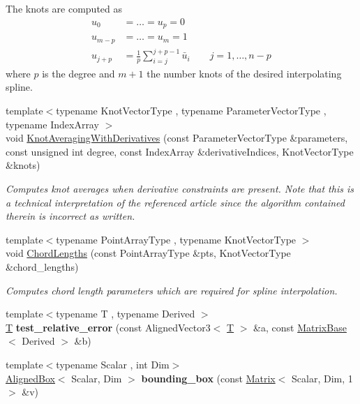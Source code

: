 \begin{DoxyCompactItemize}
\begin{DoxyCompactList}
The knots are computed as \begin{align*} u_0 & = \hdots = u_p = 0 \\ u_{m-p} & = \hdots = u_{m} = 1 \\ u_{j+p} & = \frac{1}{p}\sum_{i=j}^{j+p-1}\bar{u}_i \quad\quad j=1,\hdots,n-p \end{align*} where $p$ is the degree and $m+1$ the number knots of the desired interpolating spline. \end{DoxyCompactList}\item 
{\footnotesize template$<$typename Knot\+Vector\+Type , typename Parameter\+Vector\+Type , typename Index\+Array $>$ }\\void \hyperlink{group___splines___module_gae10a6f9b6ab7fb400a2526b6382c533b}{Knot\+Averaging\+With\+Derivatives} (const Parameter\+Vector\+Type \&parameters, const unsigned int degree, const Index\+Array \&derivative\+Indices, Knot\+Vector\+Type \&knots)
\begin{DoxyCompactList}\small\item\em Computes knot averages when derivative constraints are present. Note that this is a technical interpretation of the referenced article since the algorithm contained therein is incorrect as written. \end{DoxyCompactList}\item 
{\footnotesize template$<$typename Point\+Array\+Type , typename Knot\+Vector\+Type $>$ }\\void \hyperlink{group___splines___module_ga1b4cbde5d98411405871accf877552d2}{Chord\+Lengths} (const Point\+Array\+Type \&pts, Knot\+Vector\+Type \&chord\+\_\+lengths)
\begin{DoxyCompactList}\small\item\em Computes chord length parameters which are required for spline interpolation. \end{DoxyCompactList}\item 
\mbox{\label{namespace_eigen_a32e2db3496afe9750491c1f712e28dbc}} 
{\footnotesize template$<$typename T , typename Derived $>$ }\\\hyperlink{group___sparse_core___module}{T} {\bfseries test\+\_\+relative\+\_\+error} (const Aligned\+Vector3$<$ \hyperlink{group___sparse_core___module}{T} $>$ \&a, const \hyperlink{group___core___module_class_eigen_1_1_matrix_base}{Matrix\+Base}$<$ Derived $>$ \&b)
\item 
\mbox{\label{namespace_eigen_af3e65cf6a0f2ac4f27b798ccd3f74adf}} 
{\footnotesize template$<$typename Scalar , int Dim$>$ }\\\hyperlink{group___geometry___module_class_eigen_1_1_aligned_box}{Aligned\+Box}$<$ Scalar, Dim $>$ {\bfseries bounding\+\_\+box} (const \hyperlink{group___core___module_class_eigen_1_1_matrix}{Matrix}$<$ Scalar, Dim, 1 $>$ \&v)
\end{DoxyCompactItemize}
